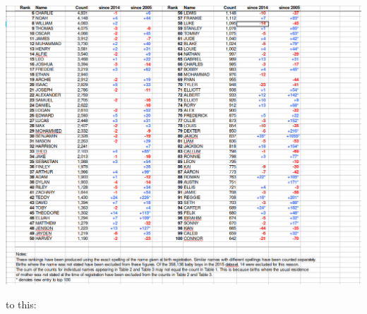 \documentclass[
]{book}
\begin{document}
\includegraphics{R/RDataWrangling/images/messy.png}

to this:
\end{document}
